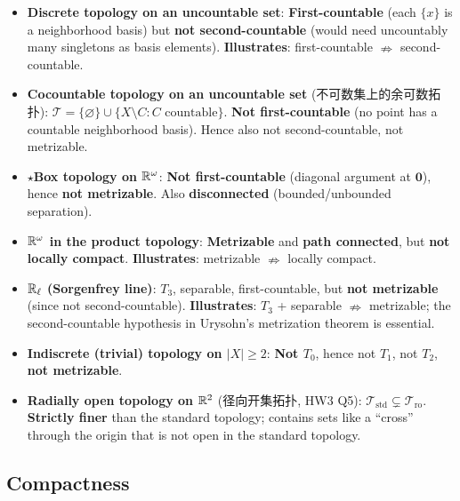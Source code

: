 \documentclass{article}
\newcommand{\starKey}{\textcolor{red!65!black}{\textbf{$\star$}}}
\begin{document}
\begin{itemize}
  \item \textbf{Discrete topology on an uncountable set}:
  \textbf{First-countable} (each $\{x\}$ is a neighborhood basis) but
  \textbf{not second-countable} (would need uncountably many singletons as basis elements).
  \textbf{Illustrates}: first-countable $\nRightarrow$ second-countable.

  \item \textbf{Cocountable topology on an uncountable set} (不可数集上的余可数拓扑):
  $\mathcal{T}=\{\varnothing\}\cup\{X\setminus C:C\text{ countable}\}$.
  \textbf{Not first-countable} (no point has a countable neighborhood basis).
  Hence also not second-countable, not metrizable.

  \item \starKey \textbf{Box topology on $\mathbb{R}^\omega$}:
  \textbf{Not first-countable} (diagonal argument at $\mathbf{0}$), hence
  \textbf{not metrizable}. Also \textbf{disconnected} (bounded/unbounded separation).

  \item \textbf{$\mathbb{R}^\omega$ in the product topology}:
  \textbf{Metrizable} and \textbf{path connected}, but \textbf{not locally compact}.
  \textbf{Illustrates}: metrizable $\nRightarrow$ locally compact.

  \item \textbf{$\mathbb{R}_\ell$ (Sorgenfrey line)}: $T_3$, separable, first-countable, but
  \textbf{not metrizable} (since not second-countable).
  \textbf{Illustrates}: $T_3$ + separable $\nRightarrow$ metrizable;
  the second-countable hypothesis in Urysohn's metrization theorem is essential.

  \item \textbf{Indiscrete (trivial) topology on $|X|\ge2$}:
  \textbf{Not $T_0$}, hence not $T_1$, not $T_2$, \textbf{not metrizable}.

  \item \textbf{Radially open topology on $\mathbb{R}^2$} (径向开集拓扑, HW3 Q5):
  $\mathcal{T}_{\mathrm{std}}\subsetneq\mathcal{T}_{\mathrm{ro}}$.
  \textbf{Strictly finer} than the standard topology; contains sets like a
  ``cross'' through the origin that is not open in the standard topology.
\end{itemize}

\subsection{Compactness}
\end{document}
